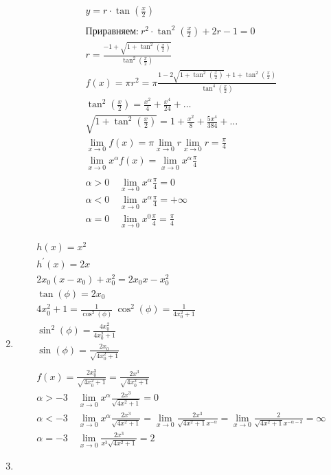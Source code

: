 \begin{enumerate}
\begin{gather*}
				y = r \cdot \tan(\frac{x}{2})\\
				\\
				\text{Приравняем:}\ r^{2} \cdot \tan^{2}(\frac{x}{2}) + 2r - 1 = 0\\
				r = \frac{ - 1 + \sqrt{1 + \tan^{2}(\frac{x}{2})}}{\tan^{2}(\frac{x}{2})}\\
				f(x) = \pi r^2 = \pi \frac{1 - 2 \sqrt{1 + \tan^{2}(\frac{x}{2})} + 1 + \tan^{2}(\frac{x}{2})}{\tan^{4}(\frac{x}{2})}\\
				\tan^{2}(\frac{x}{2}) = \frac{x^2}{4} + \frac{x^4}{24} + \ldots\\
				\sqrt{1 + \tan^{2}(\frac{x}{2})} = 1 + \frac{x^2}{8} + \frac{5x^4}{384} + \ldots\\ 
				\lim\limits_{x\to 0}f(x) = \pi \lim\limits_{x\to 0}r \lim\limits_{x\to 0}r = \frac{\pi}{4}\\
				\lim\limits_{x\to 0} x^{\alpha}f(x) = \lim\limits_{x\to 0} x^{\alpha} \frac{\pi}{4}\\
				\\
				\alpha >0\quad \lim\limits_{x\to 0} x^{\alpha} \frac{\pi}{4} = 0\\
				\alpha <0\quad \lim\limits_{x\to 0} x^{\alpha} \frac{\pi}{4} = + \infty\\
				\alpha = 0\quad \lim\limits_{x\to 0} x^{0} \frac{\pi}{4} = \frac{\pi}{4}
			\end{gather*}
		\item
			\begin{gather*}
				h(x) = x^2\\
				h^{\prime}(x) = 2x\\
				2x_0 (x - x_0) + x_0^2 = 2x_0 x - x_0^2\\
				\tan(\phi) = 2x_0\\
				4x_0^2 + 1 = \frac{1}{\cos^2(\phi)}\
				\cos^2(\phi) = \frac{1}{4x_0^2 + 1}\\
				\sin^2(\phi) = \frac{4x_0^2}{4x_0^2 + 1}\\
				\sin(\phi) = \frac{2x_0}{\sqrt{4x_0^2 + 1}}\\
				\\
				f(x) = \frac{2x_0^3}{\sqrt{4x_0^2 + 1}} = \frac{2x^3}{\sqrt{4x_0^2 + 1}}\\
				\alpha > - 3\quad \lim\limits_{x\to 0} x^{\alpha} \frac{2x^3}{\sqrt{4x^2 + 1}} = 0\\
				\alpha < - 3\quad \lim\limits_{x\to 0} x^{\alpha} \frac{2x^3}{\sqrt{4x^2 + 1}} = \lim\limits_{x\to 0} \frac{2x^3}{\sqrt{4x^2 + 1} x^{ - \alpha}} = \lim\limits_{x\to 0} \frac{2}{\sqrt{4x^2 + 1} x^{ - \alpha - 3}} = \infty\\
				\alpha = - 3\quad \lim\limits_{x\to 0} \frac{2x^3}{x^3 \sqrt{4x^2 + 1}} = 2
			\end{gather*} 
		\item 		
		\end{enumerate}
		
